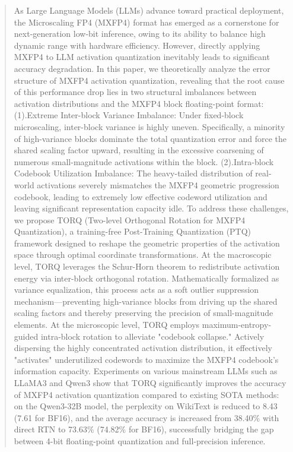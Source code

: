 \begin{abstract}
As Large Language Models (LLMs) advance toward practical deployment, the Microscaling FP4 (MXFP4) format has emerged as a cornerstone for next-generation low-bit inference, owing to its ability to balance high dynamic range with hardware efficiency. However, directly applying MXFP4 to LLM activation quantization inevitably leads to significant accuracy degradation. In this paper, we theoretically analyze the error structure of MXFP4 activation quantization, revealing that the root cause of this performance drop lies in two structural imbalances between activation distributions and the MXFP4 block floating-point format: (1).Extreme Inter-block Variance Imbalance: Under fixed-block microscaling, inter-block variance is highly uneven. Specifically, a minority of high-variance blocks dominate the total quantization error and force the shared scaling factor upward, resulting in the excessive coarsening of numerous small-magnitude activations within the block. 
(2).Intra-block Codebook Utilization Imbalance: The heavy-tailed distribution of real-world activations severely mismatches the MXFP4 geometric progression codebook, leading to extremely low effective codeword utilization and leaving significant representation capacity idle.
To address these challenges, we propose TORQ (Two-level Orthogonal Rotation for MXFP4 Quantization), a training-free Post-Training Quantization (PTQ) framework designed to reshape the geometric properties of the activation space through optimal coordinate transformations. 
At the macroscopic level, TORQ leverages the Schur-Horn theorem to redistribute activation energy via inter-block orthogonal rotation. Mathematically formalized as variance equalization, this process acts as a soft outlier suppression mechanism—preventing high-variance blocks from driving up the shared scaling factors and thereby preserving the precision of small-magnitude elements.
At the microscopic level, TORQ employs maximum-entropy-guided intra-block rotation to alleviate "codebook collapse." Actively dispersing the highly concentrated activation distribution, it effectively "activates" underutilized codewords to maximize the MXFP4 codebook’s information capacity.
Experiments on various mainstream LLMs such as LLaMA3 and Qwen3 show that TORQ significantly improves the accuracy of MXFP4 activation quantization compared to existing SOTA methods: on the Qwen3-32B model, the perplexity on WikiText is reduced to 8.43 (7.61 for BF16), and the average accuracy is increased from 38.40\% with direct RTN to 73.63\% (74.82\% for BF16), successfully bridging the gap between 4-bit floating-point quantization and full-precision inference.
\end{abstract}